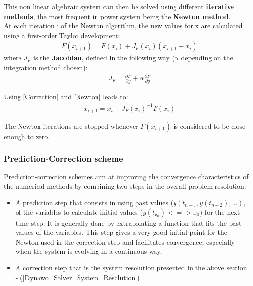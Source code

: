 \documentclass[a4paper, 12pt]{report}
\begin{document}
This non linear algebraic system can then be solved using different \textbf{iterative methods}, the most frequent in power system being the \textbf{Newton method}. \\

At each iteration i of the Newton algorithm, the new values for x are calculated using a first-order Taylor development:
\begin{equation}
\begin{aligned}
& F(x_{i+1}) = F(x_i) + J_F(x_i)(x_{i+1} - x_i)
\end{aligned}
\label{Newton}
\end{equation}
where $J_F$ is the \textbf{Jacobian}, defined in the following way ($\alpha$ depending on the integration method chosen):
\begin{equation}
\begin{aligned}
& J_F = \frac{\partial F}{\partial y} + \alpha \frac{\partial F}{\partial \dot{y}}
\end{aligned}
\end{equation}

Using \eqref{Correction} and \eqref{Newton} leads to:
\begin{equation}
\begin{aligned}
& x_{i+1} = x_i - J_F(x_i)^{-1} F(x_i)
\end{aligned}
\label{Linear}
\end{equation}

The Newton iterations are stopped whenever $F(x_{i+1})$ is considered to be close enough to zero. 

\subsubsection{Prediction-Correction scheme}

Prediction-correction schemes aim at improving the convergence characteristics of the numerical methods by combining two steps in the overall problem resolution:
\begin{itemize}
\item A prediction step that consists in using past values ($y(t_{n-1}, y(t_{n-2}), ...)$,  of the variables to calculate initial values ($y(t_{n_0}) <=> x_0$) for the next time step. It is generally done by extrapolating a function that fits the past values of the variables. This step gives a very good initial point for the Newton used in the correction step and facilitates convergence, especially when the system is evolving in a continuous way. 
\item A correction step that is the system resolution presented in the above section - (\ref{Dynawo_Solver_System_Resolution})
\end{itemize}
\end{document}
